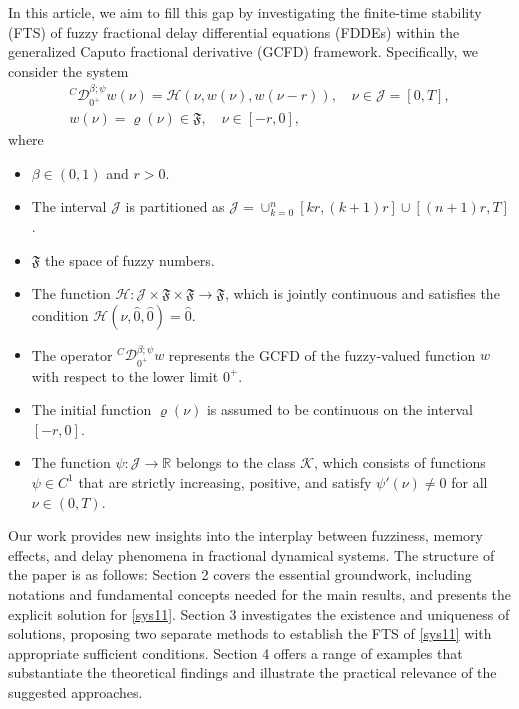 \documentclass[reqno]{amsart}
\begin{document}
In this article, we aim to fill this gap by investigating the finite-time stability
(FTS) of fuzzy fractional delay differential equations (FDDEs) within the generalized
Caputo fractional derivative (GCFD) framework.
Specifically, we consider the system
\begin{equation} \label{sys11}
\begin{gathered}
{}^C \mathcal{D}_{0^{+}}^{\beta ; \psi} w(\nu )=\mathcal{H}(\nu , w(\nu ),
 w(\nu - r)),\quad \nu \in \mathcal{J}=[0, T], \\
 w(\nu )=\varrho(\nu ) \in \mathfrak{F}, \quad \nu \in[- r, 0],
\end{gathered}
\end{equation}
where
\begin{itemize}
\item $\beta \in (0,1)$ and $r> 0$.

\item The interval $\mathcal{J}$ is partitioned as $\mathcal{J}
= \cup_{k=0}^{n} [k r, (k+1) r] \cup [(n+1) r, T]$.

\item $\mathfrak{F}$ the space of fuzzy numbers.

\item The function
$\mathcal{H} : \mathcal{J} \times \mathfrak{F} \times \mathfrak{F} \to \mathfrak{F}$,
which is jointly continuous and satisfies the condition $\mathcal{H}(\nu , \hat{0},
\hat{0}) = \hat{0}$.

\item The operator ${}^C \mathcal{D}_{0^{+}}^{\beta;\psi} w$ represents the
 GCFD of the fuzzy-valued function $ w$ with respect to the lower limit $0^+$.

\item The initial function $\varrho(\nu )$ is assumed to be continuous on the
interval $[-r, 0]$.

\item The function $\psi : \mathcal{J} \to \mathbb{R}$ belongs to the class
$\mathcal{K}$, which consists of functions $\psi \in C^1$ that are strictly
increasing, positive, and satisfy $\psi'(\nu ) \neq 0$ for all $\nu \in (0, T)$.
\end{itemize}

Our work provides new insights into the interplay between fuzziness, memory effects,
and delay phenomena in fractional dynamical systems.
The structure of the paper is as follows:
Section 2 covers the essential groundwork, including notations and fundamental concepts
needed for the main results, and presents the explicit solution for \eqref{sys11}.
Section 3 investigates the existence and uniqueness of solutions, proposing two
separate methods to establish the FTS of \eqref{sys11} with appropriate sufficient
conditions.
Section 4 offers a range of examples that substantiate the theoretical findings
and illustrate the practical relevance of the suggested approaches.
\end{document}
